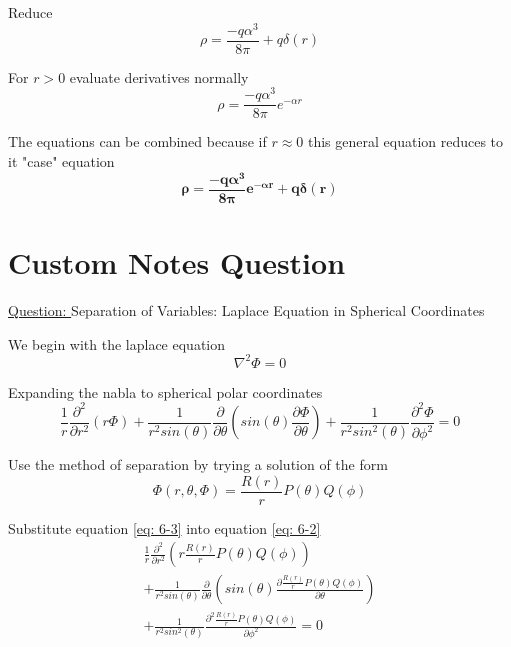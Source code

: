 \documentclass[English]{article}
\begin{document}
    Reduce 
    \begin{equation} \label{eq: 5-10}
        \rho = \frac{-q \alpha^3}{8 \pi} + q \delta(r)
    \end{equation}

    For $r > 0$ evaluate derivatives normally
    \begin{equation} \label{eq: 5-11}
        \rho = \frac{-q \alpha^3}{8 \pi} e^{- \alpha r}
    \end{equation}

    The equations can be combined because if $r \approx 0$ this general equation reduces to it "case" equation
    \begin{equation} \label{eq: 5-12}
        \boxed{\boldsymbol{\rho = \frac{-q \alpha^3}{8 \pi} e^{- \alpha r}+ q \delta(r)}}
    \end{equation}

\newpage
\section{Custom Notes Question} \label{section6}
    \underline{Question: }
    \newline \newline Separation of Variables: Laplace Equation in Spherical Coordinates

    We begin with the laplace equation
    \begin{equation} \label{eq: 6-1}
        \nabla^2 \Phi = 0
    \end{equation}

    Expanding the nabla to spherical polar coordinates
    \begin{equation} \label{eq: 6-2}
        \frac{1}{r} \frac{\partial^2}{\partial r^2} (r \Phi) + \frac{1}{r^2 sin(\theta)} \frac{\partial}{\partial \theta} (sin(\theta) \frac{\partial \Phi}{\partial \theta}) + \frac{1}{r^2 sin^2(\theta)} \frac{\partial^2 \Phi}{\partial \phi^2} = 0
    \end{equation}

    Use the method of separation by trying a solution of the form
    \begin{equation} \label{eq: 6-3}
        \Phi(r,\theta, \Phi) = \frac{R(r)}{r} P(\theta) Q(\phi)
    \end{equation}

    Substitute equation \ref{eq: 6-3} into equation \ref{eq: 6-2}
    \begin{gather*}
        \frac{1}{r} \frac{\partial^2}{\partial r^2} (r \frac{R(r)}{r} P(\theta) Q(\phi)) 
        \\ + \frac{1}{r^2 sin(\theta)} \frac{\partial}{\partial \theta} (sin(\theta) \frac{\partial \frac{R(r)}{r} P(\theta) Q(\phi)}{\partial \theta}) 
        \\ + \frac{1}{r^2 sin^2(\theta)} \frac{\partial^2 \frac{R(r)}{r} P(\theta) Q(\phi)}{\partial \phi^2} = 0
    \end{gather*}
\end{document}
